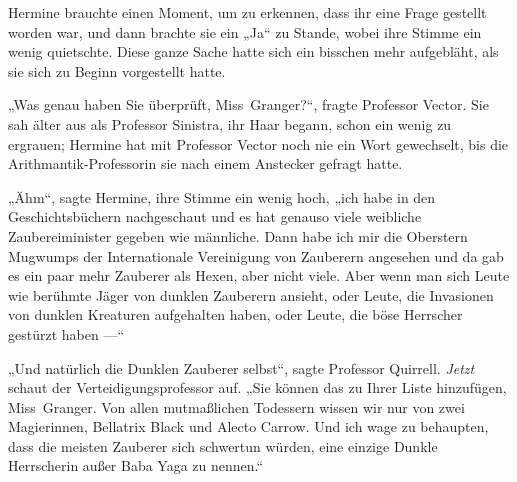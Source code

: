 Hermine brauchte einen Moment, um zu erkennen, dass ihr eine Frage gestellt worden war, und dann brachte sie ein
„Ja“ zu Stande, wobei ihre Stimme ein wenig quietschte. Diese ganze Sache hatte sich ein bisschen mehr aufgebläht, als sie sich zu Beginn vorgestellt hatte.

„Was genau haben Sie überprüft, Miss~Granger?“, fragte Professor Vector. Sie sah älter aus als Professor Sinistra, ihr Haar begann, schon ein wenig zu ergrauen; Hermine hat mit Professor Vector noch nie ein Wort gewechselt, bis die Arithmantik-Professorin sie nach einem Anstecker gefragt hatte.

„Ähm“, sagte Hermine, ihre Stimme ein wenig hoch, „ich habe in den Geschichtsbüchern nachgeschaut und es hat genauso viele weibliche Zaubereiminister gegeben wie männliche. Dann habe ich mir die Oberstern Mugwumps der Internationale Vereinigung von Zauberern angesehen und da gab es ein paar mehr Zauberer als Hexen, aber nicht viele. Aber wenn man sich Leute wie berühmte Jäger von dunklen Zauberern ansieht, oder Leute, die Invasionen von dunklen Kreaturen aufgehalten haben, oder Leute, die böse Herrscher gestürzt haben —“

„Und natürlich die Dunklen Zauberer selbst“, sagte Professor Quirrell. \emph{Jetzt} schaut der Verteidigungsprofessor auf.
„Sie können das zu Ihrer Liste hinzufügen, Miss~Granger. Von allen mutmaßlichen Todessern wissen wir nur von zwei Magierinnen, Bellatrix Black und Alecto Carrow. Und ich wage zu behaupten, dass die meisten Zauberer sich schwertun würden, eine einzige Dunkle Herrscherin außer Baba Yaga zu nennen.“

